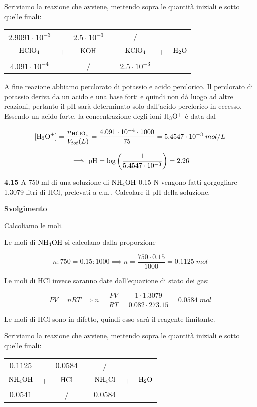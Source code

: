 Scriviamo la reazione che avviene, mettendo sopra le quantità iniziali e sotto quelle finali:

\begin{center}
    \begin{tabular}{ccccccc}
        $2.9091 \cdot 10^{-3}$ &  & $2.5 \cdot 10^{-3}$ & & / &&\\
        $\rm HClO_4$ & + & $\rm KOH$ & \ce{->} & $\rm KClO_4$ & + & $\rm H_2O$\\
        $4.091 \cdot 10^{-4}$ &  & / & & $2.5 \cdot 10^{-3}$ &&\\
    \end{tabular}
\end{center}

A fine reazione abbiamo perclorato di potassio e acido perclorico. Il perclorato di potassio deriva da un acido e una base forti e quindi non dà luogo ad altre reazioni, pertanto il pH sarà determinato solo dall'acido perclorico in eccesso. Essendo un acido forte, la concentrazione degli ioni $\rm H_3O^+$ è data dal

$$[\text{H}_3\text{O}^+]=\frac{n_{\rm HClO_4}}{V_{tot}(L)}=\frac{4.091 \cdot 10^{-4} \cdot 1000}{75}=5.4547 \cdot 10^{-3}\;mol/L$$

$$\implies \rm pH=\log{\left(\frac{1}{5.4547 \cdot 10^{-3}}\right)}=2.26$$

\vspace{0.2cm}\textbf{4.15} A 750 ml di una soluzione di $\rm NH_4OH$ 0.15 N vengono fatti gorgogliare 1.3079 litri di HCl, prelevati a c.n.\,. Calcolare il pH della soluzione.

\vspace{0.2cm}\large\textbf{Svolgimento}\normalsize

\vspace{0.2cm}Calcoliamo le moli.

Le moli di $\rm NH_4OH$ si calcolano dalla proporzione

$$n:750=0.15:1000
\implies
n=\frac{750 \cdot 0.15}{1000}=0.1125\;mol$$

Le moli di HCl invece saranno date dall'equazione di stato dei gas:

$$PV=nRT \implies n=\frac{PV}{RT}
=\frac{1 \cdot 1.3079}{0.082 \cdot 273.15}=0.0584\;mol$$

Le moli di HCl sono in difetto, quindi esso sarà il reagente limitante.

Scriviamo la reazione che avviene, mettendo sopra le quantità iniziali e sotto quelle finali:

\begin{center}
    \begin{tabular}{ccccccc}
        $0.1125$ &  & $0.0584$ & & / &&\\
        $\rm NH_4OH$ & + & $\rm HCl$ & \ce{->} & $\rm NH_4Cl$ & + & $\rm H_2O$\\
        $0.0541$ &  & / & & $0.0584$ &&\\
    \end{tabular}
\end{center}

